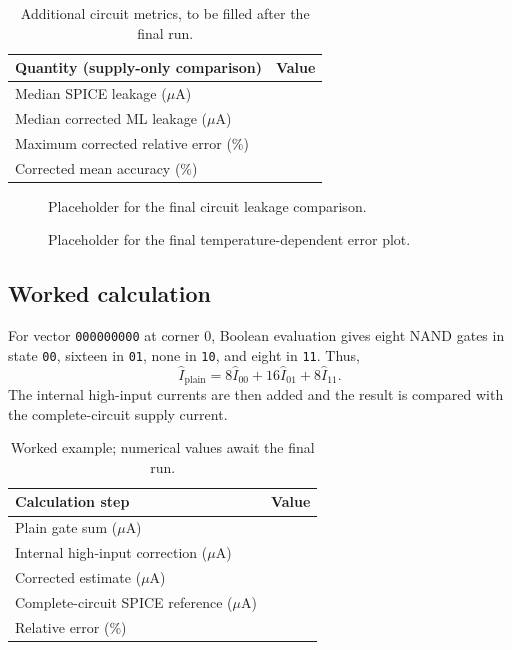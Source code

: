 \documentclass{article}
\begin{document}
\begin{table}[H]
\centering
\begin{tabular}{lr}
\toprule
Quantity (supply-only comparison) & Value\\
\midrule
Median SPICE leakage ($\mu$A) & \\
Median corrected ML leakage ($\mu$A) & \\
Maximum corrected relative error (\%) & \\
Corrected mean accuracy (\%) & \\
\bottomrule
\end{tabular}
\caption{Additional circuit metrics, to be filled after the final run.}
\end{table}

\begin{figure}[H]
\centering
{}
\caption{Placeholder for the final circuit leakage comparison.}
\label{fig:circuitparity}
\end{figure}

\begin{figure}[H]
\centering
{}
\caption{Placeholder for the final temperature-dependent error plot.}
\label{fig:circuittemperature}
\end{figure}

\subsection{Worked calculation}
For vector \texttt{000000000} at corner 0, Boolean evaluation gives eight
NAND gates in state \texttt{00}, sixteen in \texttt{01}, none in
\texttt{10}, and eight in \texttt{11}. Thus,
\begin{equation}
\widehat I_{\mathrm{plain}}=
8\widehat I_{00}+16\widehat I_{01}+8\widehat I_{11}.
\end{equation}
The internal high-input currents are then added and the result is compared
with the complete-circuit supply current.
\begin{table}[H]
\centering
\begin{tabular}{lr}
\toprule
Calculation step & Value\\
\midrule
Plain gate sum ($\mu$A) & \\
Internal high-input correction ($\mu$A) & \\
Corrected estimate ($\mu$A) & \\
Complete-circuit SPICE reference ($\mu$A) & \\
Relative error (\%) & \\
\bottomrule
\end{tabular}
\caption{Worked example; numerical values await the final run.}
\end{table}
\end{document}

